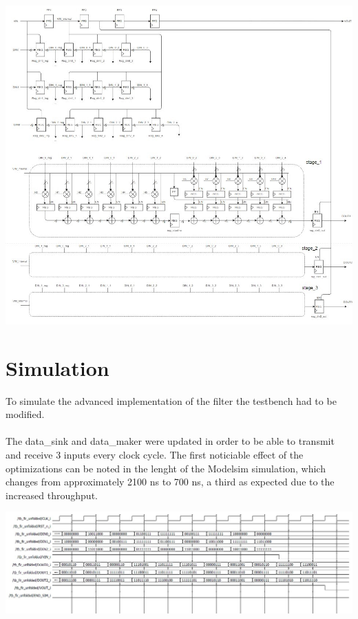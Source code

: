 \vspace{5mm}
\centerline{
\includegraphics[width=15.5cm]{./chapters/figures/fir_adv_2.jpg}}

\vspace{5mm}

\section{Simulation}

To simulate the advanced implementation of the filter the testbench had to be modified.
\paragraph{} 
The data\_sink and data\_maker were updated in order to be able to transmit and receive 3 inputs every clock cycle.
The first noticiable effect of the optimizations can be noted in the lenght of the Modelsim simulation, which changes from
approximately 2100 ns to 700 ns, a third as expected due to the increased throughput.

\vspace{5mm}
\centerline{
\includegraphics[width=15.5cm]{./chapters/figures/waveform2.jpg}}

